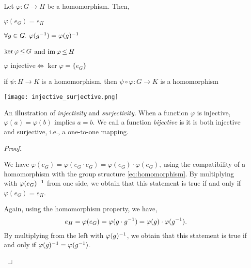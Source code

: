 \begin{lem}
Let $\varphi : G \to H$ be a homomorphism. Then,
\begin{lemlist}
    \item $\varphi(e_G) = e_H$
    \item $\forall g \in G.\ \varphi(g^{-1}) = \varphi(g)^{-1}$
    \item\label{lem:homomorphism_kernel_subgroup} $\ker{\varphi} \operatorname*{\leq} G$ and $\operatorname*{im}{\varphi} \operatorname*{\leq} H$
    \item $\text{$\varphi$ injective} \iff \ker{\varphi} = \{e_G\}$
    \item if $\psi : H \to K$ is a homomorphism, then $\psi \circ \varphi : G \to K$ is a homomorphism
\end{lemlist}
\end{lem} \begin{marginfigure}
    \texttt{[image: injective\_surjective.png]}
    \caption{An illustration of \emph{injectivity} and \emph{surjectivity}. When a function $\varphi$ is injective, $\varphi(a) = \varphi(b)$ implies $a = b$. We call a function \emph{bijective} is it is both injective and surjective, i.e., a one-to-one mapping.}
\end{marginfigure} \begin{proof}
\leavevmode\begin{lemlist}
    \item We have $\varphi(e_G) = \varphi(e_G \cdot e_G) = \varphi(e_G) \cdot \varphi(e_G)$, using the compatibility of a homomorphism with the group structure \eqref{eq:homomorphism}. By multiplying with $\varphi(e_G)^{-1}$ from one side, we obtain that this statement is true if and only if $\varphi(e_G) = e_H$.
    
    \item Again, using the homomorphism property, we have, \begin{align*}
        e_H = \varphi(e_G) = \varphi(g \cdot g^{-1}) = \varphi(g) \cdot \varphi(g^{-1}).
    \end{align*} By multiplying from the left with $\varphi(g)^{-1}$, we obtain that this statement is true if and only if $\varphi(g)^{-1} = \varphi(g^{-1})$.
    

\end{lemlist}
\end{proof}
